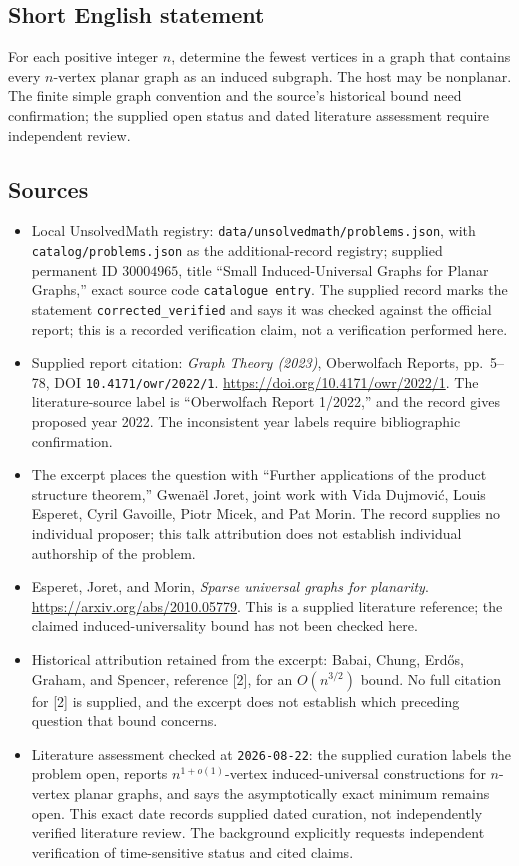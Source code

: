 \documentclass[11pt]{article}
\begin{document}
\subsection{Short English statement}
For each positive integer \(n\), determine the fewest vertices in a graph that contains every \(n\)-vertex planar graph as an induced subgraph. The host may be nonplanar. The finite simple graph convention and the source's historical bound need confirmation; the supplied open status and dated literature assessment require independent review.
\subsection{Sources}
\begin{itemize}
\item Local UnsolvedMath registry: \texttt{data/unsolvedmath/problems.json}, with \texttt{catalog/problems.json} as the additional-record registry; supplied permanent ID \(30004965\), title ``Small Induced-Universal Graphs for Planar Graphs,'' exact source code \texttt{catalogue entry}. The supplied record marks the statement \texttt{corrected\_verified} and says it was checked against the official report; this is a recorded verification claim, not a verification performed here.
\item Supplied report citation: \emph{Graph Theory (2023)}, Oberwolfach Reports, pp.~5--78, DOI \texttt{10.4171/owr/2022/1}. \url{https://doi.org/10.4171/owr/2022/1}. The literature-source label is ``Oberwolfach Report 1/2022,'' and the record gives proposed year 2022. The inconsistent year labels require bibliographic confirmation.
\item The excerpt places the question with ``Further applications of the product structure theorem,'' Gwena\"el Joret, joint work with Vida Dujmovi\'c, Louis Esperet, Cyril Gavoille, Piotr Micek, and Pat Morin. The record supplies no individual proposer; this talk attribution does not establish individual authorship of the problem.
\item Esperet, Joret, and Morin, \emph{Sparse universal graphs for planarity}. \url{https://arxiv.org/abs/2010.05779}. This is a supplied literature reference; the claimed induced-universality bound has not been checked here.
\item Historical attribution retained from the excerpt: Babai, Chung, Erd\H{o}s, Graham, and Spencer, reference [2], for an \(O(n^{3/2})\) bound. No full citation for [2] is supplied, and the excerpt does not establish which preceding question that bound concerns.
\item Literature assessment checked at \texttt{2026-08-22}: the supplied curation labels the problem open, reports \(n^{1+o(1)}\)-vertex induced-universal constructions for \(n\)-vertex planar graphs, and says the asymptotically exact minimum remains open. This exact date records supplied dated curation, not independently verified literature review. The background explicitly requests independent verification of time-sensitive status and cited claims.
\end{itemize}
\end{document}
